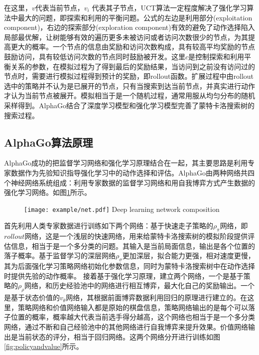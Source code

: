 在这里，$v$代表当前节点，$ v_i$ 代表其子节点，UCT算法一定程度解决了强化学习算法中最大的问题，即探索和利用的平衡问题。公式的左边是利用部分(exploitation component)，右边的探索部分(exploration component)有效的避免了动作选择陷入局部最优解，让树能够有效的遍历更多未被访问或者访问次数很少的节点，为其提高更大的概率。一个节点的信息由奖励和访问次数构成，具有较高平均奖励的节点鼓励访问，具有较低访问次数的节点同时鼓励被开发。这里$c$是控制探索和利用平衡关系的参数，在模拟过程为了得到最后的奖励结果，当访问到之前没有访问过的节点时，需要进行模拟过程得到预计的奖励，即rollout函数。扩展过程中由rollout选中的策略并不认为是已展开的节点，只有当搜索到达当前节点，并真实进行动作才认为当前节点被展开。模拟相当于是一个随机过程，通常用服从均匀分布的随机采样得到。AlphaGo结合了深度学习模型和强化学习模型完善了蒙特卡洛搜索树的搜索过程。

\subsection{AlphaGo算法原理}
AlphaGo成功的把监督学习网络和强化学习原理结合在一起，其主要思路是利用专家数据作为先验知识指导强化学习中的动作选择和评估。AlphaGo由两种网络共四个神经网络系统组成：利用专家数据的监督学习网络和用自我博弈方式产生数据的强化学习网络。如图\ref{fig:net}所示。

\begin{figure}[htbp]
	\centering
	\texttt{[image: example/net.pdf]}
	{Deep learning network composition}
	\label{fig:net}
\end{figure}

首先利用人类专家数据进行训练如下两个网络：基于快速走子策略的${\rho _\pi }$网络，即$roll out$网络，这是一个浅层的快速网络，用来给蒙特卡洛搜索树的模拟阶段提供评估信息，相当于是一个多分类的问题。其输入是当前局面信息，输出是各个位置的落子概率。基于监督学习的深层网络${\rho _\sigma }$更加深层，拟合能力更强，相对速度更慢，其为后面强化学习策略网络初始化参数信息，同时为蒙特卡洛搜索树中在动作选择时提供先验的动作概率。
接着基于强化学习原理，建立两个网络，一个是基于策略的${\rho _\rho }$网络，和历史经验池中的网络进行相互博弈，最大化自己的奖励输出。一个是基于状态价值的${v_\theta }$网络，其根据前面博弈数据利用回归的原理进行建立的。在这里，策略网络和价值网络输入都是原始的棋盘信息，策略网络输出的是每个可以落子位置的概率，概率越大代表当前选手得分越高，这个网络也相当于是一个多分类网络，通过不断和自己经验池中的其他网络进行自我博弈来提升效果。价值网络输出是当前状态的评分，相当于回归网络。这两个网络分开进行训练如图\ref{fig:policyandvalue}所示。

